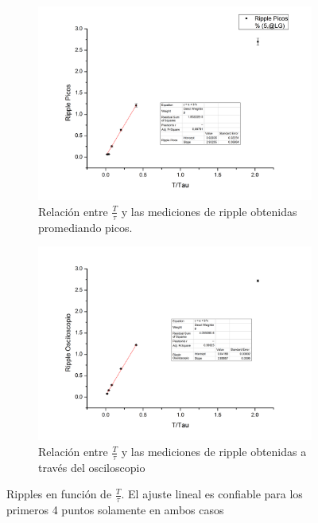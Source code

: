 \documentclass[11pt,a4paper]{article}
\begin{document}
\begin{figure}[h]
\begin{subfigure}{0.5\textwidth}
\includegraphics[scale=0.35]{Ripple_Picos}
  \caption{Relación entre $\frac{T}{\tau}$ y las mediciones de ripple obtenidas promediando picos.}
  \label{subfig:picos}
\end{subfigure}
\begin{subfigure}{0.5\textwidth}
\includegraphics[scale=0.35]{Ripple_Osc}
  \caption{Relación entre $\frac{T}{\tau}$ y las mediciones de ripple obtenidas a través del osciloscopio}
  \label{subfig:osc}
\end{subfigure}
  \caption{Ripples en función de  $\frac{T}{\tau}$. El ajuste lineal es confiable para los primeros 4 puntos solamente en ambos casos}
  \label{fig:ripples_Tau}
\end{figure}
\end{document}
